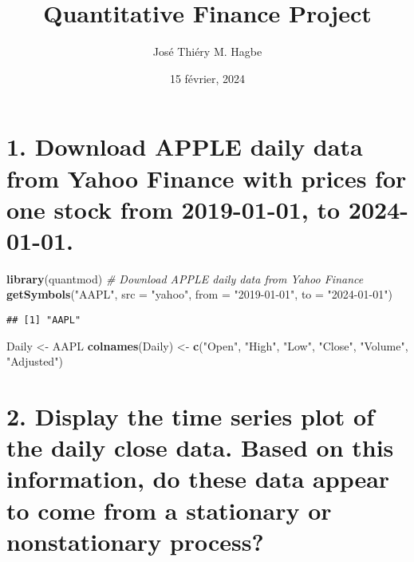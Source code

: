 \documentclass[
]{article}
\title{Quantitative Finance Project}
\author{José Thiéry M. Hagbe}
\date{15 février, 2024}
\newenvironment{Shaded}{\begin{snugshade}}{\end{snugshade}}
\newcommand{\AttributeTok}[1]{\textcolor[rgb]{0.13,0.29,0.53}{#1}}
\newcommand{\CommentTok}[1]{\textcolor[rgb]{0.56,0.35,0.01}{\textit{#1}}}
\newcommand{\FunctionTok}[1]{\textcolor[rgb]{0.13,0.29,0.53}{\textbf{#1}}}
\newcommand{\NormalTok}[1]{#1}
\newcommand{\OtherTok}[1]{\textcolor[rgb]{0.56,0.35,0.01}{#1}}
\newcommand{\StringTok}[1]{\textcolor[rgb]{0.31,0.60,0.02}{#1}}
\begin{document}
\maketitle

{
\setcounter{tocdepth}{2}
\tableofcontents
}
\newpage

\hypertarget{download-apple-daily-data-from-yahoo-finance-with-prices-for-one-stock-from-2019-01-01-to-2024-01-01.}{%
\section{1. Download APPLE daily data from Yahoo Finance with prices for
one stock from 2019-01-01, to
2024-01-01.}\label{download-apple-daily-data-from-yahoo-finance-with-prices-for-one-stock-from-2019-01-01-to-2024-01-01.}}

\begin{Shaded}
\begin{Highlighting}[]
\FunctionTok{library}\NormalTok{(quantmod)}
\CommentTok{\# Download APPLE daily data from Yahoo Finance}
\FunctionTok{getSymbols}\NormalTok{(}\StringTok{"AAPL"}\NormalTok{, }\AttributeTok{src =} \StringTok{"yahoo"}\NormalTok{, }\AttributeTok{from =} \StringTok{"2019{-}01{-}01"}\NormalTok{, }\AttributeTok{to =} \StringTok{"2024{-}01{-}01"}\NormalTok{)}
\end{Highlighting}
\end{Shaded}

\begin{verbatim}
## [1] "AAPL"
\end{verbatim}

\begin{Shaded}
\begin{Highlighting}[]
\NormalTok{Daily }\OtherTok{\textless{}{-}} \StringTok{\textasciigrave{}}\AttributeTok{AAPL}\StringTok{\textasciigrave{}}
\FunctionTok{colnames}\NormalTok{(Daily) }\OtherTok{\textless{}{-}} \FunctionTok{c}\NormalTok{(}\StringTok{"Open"}\NormalTok{, }\StringTok{"High"}\NormalTok{, }\StringTok{"Low"}\NormalTok{, }\StringTok{"Close"}\NormalTok{, }\StringTok{"Volume"}\NormalTok{, }\StringTok{"Adjusted"}\NormalTok{)}
\end{Highlighting}
\end{Shaded}

\hypertarget{display-the-time-series-plot-of-the-daily-close-data.-based-on-this-information-do-these-data-appear-to-come-from-a-stationary-or-nonstationary-process}{%
\section{2. Display the time series plot of the daily close data. Based
on this information, do these data appear to come from a stationary or
nonstationary
process?}\label{display-the-time-series-plot-of-the-daily-close-data.-based-on-this-information-do-these-data-appear-to-come-from-a-stationary-or-nonstationary-process}}
\end{document}
